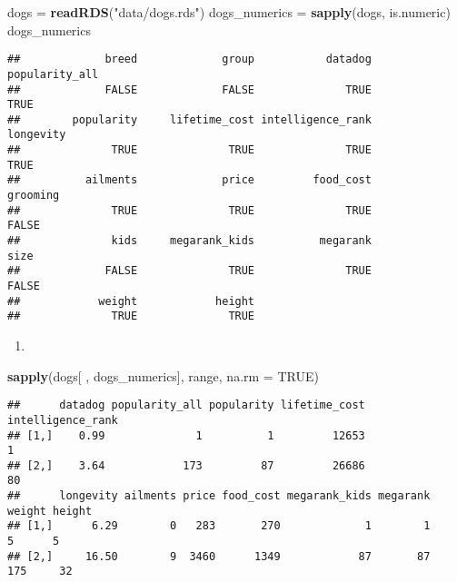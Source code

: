 \documentclass[
]{article}
\newenvironment{Shaded}{\begin{snugshade}}{\end{snugshade}}
\newcommand{\DataTypeTok}[1]{\textcolor[rgb]{0.13,0.29,0.53}{#1}}
\newcommand{\KeywordTok}[1]{\textcolor[rgb]{0.13,0.29,0.53}{\textbf{#1}}}
\newcommand{\NormalTok}[1]{#1}
\newcommand{\OtherTok}[1]{\textcolor[rgb]{0.56,0.35,0.01}{#1}}
\newcommand{\StringTok}[1]{\textcolor[rgb]{0.31,0.60,0.02}{#1}}
\providecommand{\tightlist}{%
  \setlength{\itemsep}{0pt}\setlength{\parskip}{0pt}}
\begin{document}
\begin{Shaded}
\begin{Highlighting}[]
\NormalTok{dogs =}\StringTok{ }\KeywordTok{readRDS}\NormalTok{(}\StringTok{"data/dogs.rds"}\NormalTok{)}
\NormalTok{dogs\_numerics =}\StringTok{ }\KeywordTok{sapply}\NormalTok{(dogs, is.numeric)}
\NormalTok{dogs\_numerics}
\end{Highlighting}
\end{Shaded}

\begin{verbatim}
##             breed             group           datadog    popularity_all 
##             FALSE             FALSE              TRUE              TRUE 
##        popularity     lifetime_cost intelligence_rank         longevity 
##              TRUE              TRUE              TRUE              TRUE 
##          ailments             price         food_cost          grooming 
##              TRUE              TRUE              TRUE             FALSE 
##              kids     megarank_kids          megarank              size 
##             FALSE              TRUE              TRUE             FALSE 
##            weight            height 
##              TRUE              TRUE
\end{verbatim}

\begin{enumerate}
\def\labelenumi{\arabic{enumi}.}
\setcounter{enumi}{1}
\tightlist
\item
\end{enumerate}

\begin{Shaded}
\begin{Highlighting}[]
\KeywordTok{sapply}\NormalTok{(dogs[ , dogs\_numerics], range, }\DataTypeTok{na.rm =} \OtherTok{TRUE}\NormalTok{)}
\end{Highlighting}
\end{Shaded}

\begin{verbatim}
##      datadog popularity_all popularity lifetime_cost intelligence_rank
## [1,]    0.99              1          1         12653                 1
## [2,]    3.64            173         87         26686                80
##      longevity ailments price food_cost megarank_kids megarank weight height
## [1,]      6.29        0   283       270             1        1      5      5
## [2,]     16.50        9  3460      1349            87       87    175     32
\end{verbatim}
\end{document}
